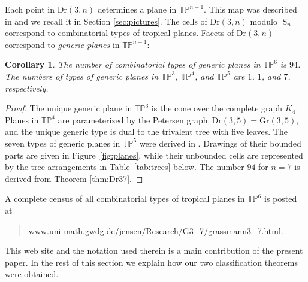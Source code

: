 \documentclass[12pt,a4paper]{amsart}
\newtheorem{cor}[thm]{Corollary}
\theoremstyle{definition}
\newcommand{\Gr}{{\mathrm{Gr}}}
\newcommand{\Dr}{{\mathrm{Dr}}}
\newcommand{\TP}{{\mathbb{TP}}}
\providecommand{\Sym}{\operatorname{S}}
\begin{document}
Each point in $\Dr(3,n)$ determines a plane in $\TP^{n-1}$.  This map
was described in \cite{Spe1, SS} and we recall it in Section
\ref{sec:pictures}.  The cells of $\Dr(3,n)$ modulo $\Sym_n$
correspond to combinatorial types of tropical planes.  Facets of
$\Dr(3,n)$ correspond to \emph{generic planes} in $\TP^{n-1}$:

\begin{cor}
  The number of combinatorial types of generic planes in $\TP^6$ is
  $94$. The numbers of types of generic planes in
  $\TP^3$, $\TP^4$, and $\TP^5$ are $1$, $1$, and $7$, respectively.
\end{cor}

\begin{proof} The unique generic plane in $\TP^3$ is the cone over the
  complete graph $K_4$. Planes in $\TP^4$ are parameterized by the
  Petersen graph $\,\Dr(3,5) = \Gr(3,5)$, and the unique generic type
  is dual to the trivalent tree with five leaves.  The seven types of
  generic planes in $\TP^5$ were derived in \cite[\S 5]{SS}. Drawings
  of their bounded parts are given in Figure~\ref{fig:planes}, while
  their unbounded cells are represented by the tree arrangements in
  Table~\ref{tab:trees} below.  The number $94$ for $n = 7$ is derived
  from Theorem \ref{thm:Dr37}.
\end{proof}

A complete census of all combinatorial types of tropical planes in
$\TP^6$ is posted at
\begin{quote}\small
  \url{www.uni-math.gwdg.de/jensen/Research/G3_7/grassmann3_7.html}.
\end{quote}
This web site and the notation used therein is a main contribution of
the present paper.  In the rest of this section we explain how our two
classification theorems were obtained.

\medskip
\end{document}
